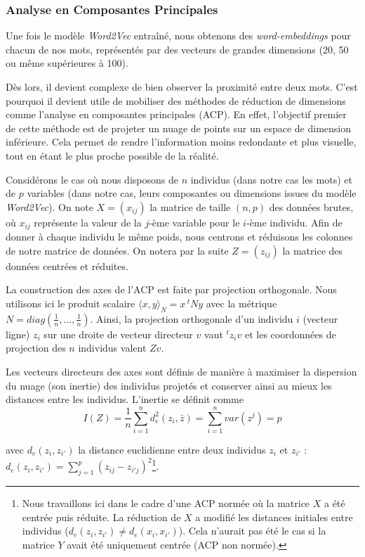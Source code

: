\documentclass[11pt,french,french]{article}
\let\rmarkdownfootnote\footnote%
\def\footnote{\protect\rmarkdownfootnote}
\begin{document}
\subsubsection{Analyse en Composantes
Principales}\label{analyse-en-composantes-principales}

Une fois le modèle \emph{Word2Vec} entraîné, nous obtenons des
\emph{word-embeddings} pour chacun de nos mots, représentés par des
vecteurs de grandes dimensions (20, 50 ou même supérieures à 100).

Dès lors, il devient complexe de bien observer la proximité entre deux
mots. C'est pourquoi il devient utile de mobiliser des méthodes de
réduction de dimensions comme l'analyse en composantes principales
(ACP). En effet, l'objectif premier de cette méthode est de projeter un
nuage de points sur un espace de dimension inférieure. Cela permet de
rendre l'information moins redondante et plus visuelle, tout en étant le
plus proche possible de la réalité.

Considérons le cas où nous disposons de \(n\) individus (dans notre cas
les mots) et de \(p\) variables (dans notre cas, leurs composantes ou
dimensions issues du modèle \emph{Word2Vec}). On note \(X = (x_{ij})\)
la matrice de taille \((n,p)\) des données brutes, où \(x_{ij}\)
représente la valeur de la \(j\)-ème variable pour le \(i\)-ème
individu. Afin de donner à chaque individu le même poids, nous centrons
et réduisons les colonnes de notre matrice de données. On notera par la
suite \(Z = (z_{ij})\) la matrice des données centrées et réduites.

La construction des axes de l'ACP est faite par projection orthogonale.
Nous utilisons ici le produit scalaire
\(\langle x,y\rangle_{N} = x\,^t N y\) avec la métrique
\(N = diag(\frac{1}{n},...,\frac{1}{n})\). Ainsi, la projection
orthogonale d'un individu \(i\) (vecteur ligne) \(z_i\) sur une droite
de vecteur directeur \(v\) vaut \(^tz_iv\) et les coordonnées de
projection des \(n\) individus valent \(Zv\).

Les vecteurs directeurs des axes sont définis de manière à maximiser la
dispersion du nuage (son inertie) des individus projetés et conserver
ainsi au mieux les distances entre les individus. L'inertie se définit
comme \[I(Z) = \frac{1}{n} \sum \limits_{i = 1}^n d_{e}^2(z_i,\bar{z}) =
\sum \limits_{i = 1}^n var(z^j) = p\]

avec \(d_{e}(z_i,z_{i'})\) la distance euclidienne entre deux individus
\(z_i\) et \(z_{i'}\) :
\(d_{e}(z_i,z_{i'}) = \sum \limits_{j=1}^p (z_{ij} - z_{i'j})^2\)\footnote{Nous
  travaillons ici dans le cadre d'une ACP normée où la matrice \(X\) a
  été centrée puis réduite. La réduction de \(X\) a modifié les
  distances initiales entre individus
  (\(d_{e}(z_i,z_{i'}) \neq d_{e}(x_i,x_{i'})\)). Cela n'aurait pas été
  le cas si la matrice \(Y\) avait été uniquement centrée (ACP non
  normée).}.
\end{document}
